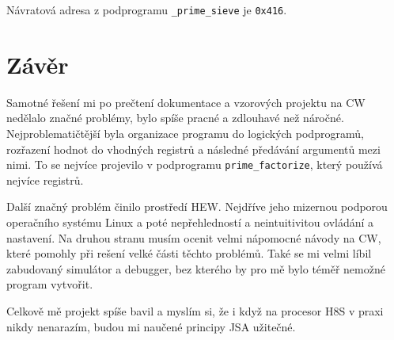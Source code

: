 \documentclass[12pt]{article}
\newcommand{\code}[1]{\mbox{\texttt{#1}}}
\begin{document}
Návratová adresa z podprogramu \code{\_prime\_sieve} je \code{0x416}.


\section{Závěr}

Samotné řešení mi po prečtení dokumentace a vzorových projektu na CW nedělalo
značné problémy, bylo spíše pracné a zdlouhavé než náročné. Nejproblematičtější
byla organizace programu do logických podprogramů, rozřazení hodnot do vhodných
registrů a následné předávání argumentů mezi nimi. To se nejvíce projevilo v
podprogramu \code{prime\_factorize}, který používá nejvíce registrů.

Další značný problém činilo prostředí HEW. Nejdříve jeho mizernou podporou
operačního systému Linux a poté nepřehledností a neintuitivitou ovládání a
nastavení. Na druhou stranu musím ocenit velmi nápomocné návody na CW, které
pomohly při rešení velké části těchto problémů. Také se mi velmi líbil
zabudovaný simulátor a debugger, bez kterého by pro mě bylo téměř nemožné
program vytvořit.

Celkově mě projekt spíše bavil a myslím si, že i když na procesor H8S v praxi
nikdy nenarazím, budou mi naučené principy JSA užitečné.
\end{document}
